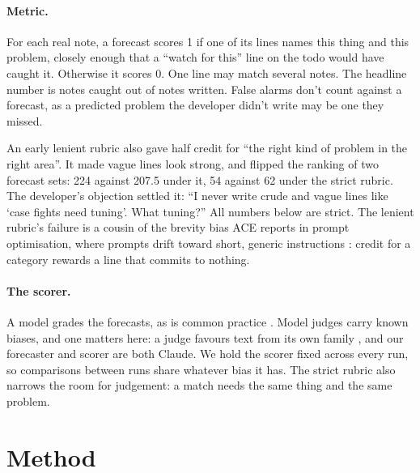 \documentclass[10pt]{article}
\begin{document}
\paragraph{Metric.} For each real note, a forecast scores 1 if one of its lines names this thing and this problem, closely enough that a ``watch for this'' line on the todo would have caught it. Otherwise it scores 0. One line may match several notes. The headline number is notes caught out of notes written. False alarms don't count against a forecast, as a predicted problem the developer didn't write may be one they missed.

An early lenient rubric also gave half credit for ``the right kind of problem in the right area''. It made vague lines look strong, and flipped the ranking of two forecast sets: 224 against 207.5 under it, 54 against 62 under the strict rubric. The developer's objection settled it: ``I never write crude and vague lines like `case fights need tuning'. What tuning?'' All numbers below are strict. The lenient rubric's failure is a cousin of the brevity bias ACE reports in prompt optimisation, where prompts drift toward short, generic instructions \citep{zhang2026ace}: credit for a category rewards a line that commits to nothing.

\paragraph{The scorer.} A model grades the forecasts, as is common practice \citep{zheng2023judging}. Model judges carry known biases, and one matters here: a judge favours text from its own family \citep{panickssery2024llm}, and our forecaster and scorer are both Claude. We hold the scorer fixed across every run, so comparisons between runs share whatever bias it has. The strict rubric also narrows the room for judgement: a match needs the same thing and the same problem.

\section{Method}
\label{sec:method}
\end{document}
